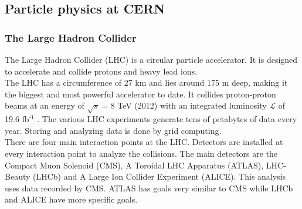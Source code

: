 \documentclass[a4paper,12pt]{article}
\newcommand{\superscript}[1]{\ensuremath{^{\textrm{#1}}}}
\begin{document}
\subsection{Particle physics at CERN}
\subsubsection{The Large Hadron Collider}
The Large Hadron Collider (LHC) is a circular particle accelerator. It is designed to accelerate and collide protons and heavy lead ions. 
\\The LHC has a circumference of 27 km and lies around 175 m deep, making it the biggest and most powerful accelerator to date. It collides proton-proton beams at an energy of $\sqrt{s} = 8$ TeV (2012) with an integrated luminosity $\mathcal{L}$ of 19.6 fb\superscript{-1} \cite{one}. The various LHC experiments generate tens of petabytes of data every year. Storing and analyzing data is done by grid computing.
\\There are four main interaction points at the LHC. Detectors are installed at every interaction point to analyze the collisions. The main detectors are the Compact Muon Solenoid (CMS), A Toroidal LHC Apparatus (ATLAS), LHC-Beauty (LHCb) and A Large Ion Collider Experiment (ALICE). This analysis uses data recorded by CMS. ATLAS has goals very similar to CMS while LHCb and ALICE have more specific goals.
\end{document}
